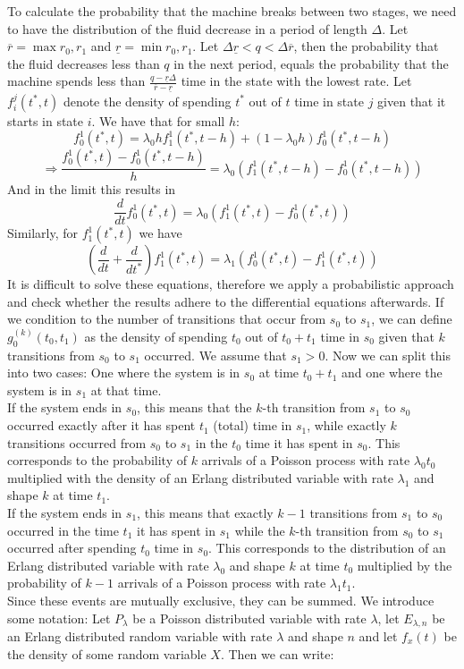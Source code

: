 To calculate the probability that the machine breaks between two stages, we need to have the distribution of the fluid decrease in a period of length $\Delta$. Let $\overline{r}=\max{r_0,r_1}$ and $\underline{r}=\min{r_0,r_1}$. Let $\Delta\underline{r}<q<\Delta\overline{r}$, then the probability that the fluid decreases less than $q$ in the next period, equals the probability that the machine spends less than $\frac{q-\underline{r}\Delta}{\overline{r}-\underline{r}}$ time in the state with the lowest rate.
Let $f_{i}^j(t^*,t)$ denote the density of spending $t^*$ out of $t$ time in state $j$ given that it starts in state $i$. We have that for small $h$:
$$
f_{0}^1(t^*,t)=\lambda_0hf_1^1(t^*,t-h)+(1-\lambda_0h)f_{0}^1(t^*,t-h)
$$
$$
\Rightarrow \frac{f_{0}^1(t^*,t)-f_{0}^1(t^*,t-h)}{h}=\lambda_0(f_1^1(t^*,t-h)-f_{0}^1(t^*,t-h))
$$
And in the limit this results in
$$
\frac{d}{dt}f_{0}^1(t^*,t)=\lambda_0(f_1^1(t^*,t)-f_{0}^1(t^*,t))
$$
Similarly, for $f_1^1(t^*,t)$ we have
$$
(\frac{d}{dt}+\frac{d}{dt^*})f_1^1(t^*,t)=\lambda_1(f_0^1(t^*,t)-f_1^1(t^*,t))
$$
It is difficult to solve these equations, therefore we apply a probabilistic approach and check whether the results adhere to the differential equations afterwards. If we condition to the number of transitions that occur from $s_0$ to $s_1$, we can define 
$
g_0^{(k)}(t_0,t_1)
$ as the density of spending $t_0$ out of $t_0+t_1$ time in $s_0$ given that $k$ transitions from $s_0$ to $s_1$ occurred. We assume that $s_1>0$. Now we can split this into two cases: One where the system is in $s_0$ at time $t_0+t_1$ and one where the system is in $s_1$ at that time. \\
If the system ends in $s_0$, this means that the $k$-th transition from $s_1$ to $s_0$ occurred exactly after it has spent $t_1$ (total) time in $s_1$, while exactly $k$ transitions occurred from $s_0$ to $s_1$ in the $t_0$ time it has spent in $s_0$. This corresponds to the probability of $k$ arrivals of a Poisson process with rate $\lambda_0t_0$ multiplied with the density of an Erlang distributed variable with rate $\lambda_1$ and shape $k$ at time $t_1$.\\
If the system ends in $s_1$, this means that exactly $k-1$ transitions from $s_1$ to $s_0$ occurred in the time $t_1$ it has spent in $s_1$ while the $k$-th transition from $s_0$ to $s_1$ occurred after spending $t_0$ time in $s_0$. This corresponds to the distribution of an Erlang distributed variable with rate $\lambda_0$ and shape $k$ at time $t_0$ multiplied by the probability of $k-1$ arrivals of a Poisson process with rate $\lambda_1t_1$.\\ Since these events are mutually exclusive, they can be summed. We introduce some notation: Let $P_{\lambda}$ be a Poisson distributed variable with rate $\lambda$, let $E_{\lambda,n}$ be an Erlang distributed random variable with rate $\lambda$ and shape $n$ and let $f_x(t)$ be the density of some random variable $X$. Then we can write:

